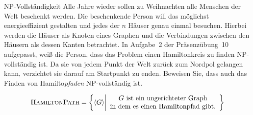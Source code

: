 \documentclass[answers]{submit}
\begin{document}
\exerciseheader
\exercisetitle

\begin{exercise}[6]{NP-Vollständigkeit}
  Alle Jahre wieder sollen zu Weihnachten alle Menschen der Welt beschenkt werden.
  Die beschenkende Person will das möglichst energieeffizient gestalten und jedes der $n$ Häuser genau einmal besuchen.
  Hierbei werden die Häuser als Knoten eines Graphen und die Verbindungen zwischen den Häusern als dessen Kanten betrachtet.
  In Aufgabe~2 der Präsenzübung~10 aufgepasst, weiß die Person, dass das Problem einen Hamiltonkreis zu finden NP-vollständig ist.
  Da sie von jedem Punkt der Welt zurück zum Nordpol gelangen kann, verzichtet sie darauf am Startpunkt zu enden.
  Beweisen Sie, dass auch das Finden von Hamilto\emph{pfaden} NP-vollständig ist.

  \[ \textsc{HamiltonPath} = \left\{\langle G\rangle \middle| \begin{array}{c}\mbox{$G$ ist ein ungerichteter Graph} \\ \mbox{in dem es einen Hamiltonpfad gibt.}\end{array} \right\} \]

\end{exercise}
\end{document}
